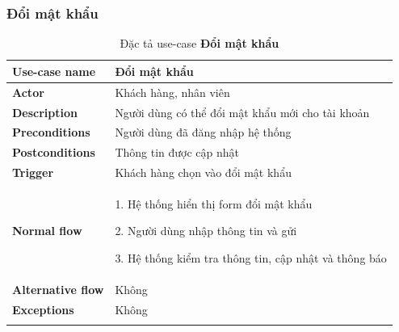 \subsubsection{Đổi mật khẩu}
{
    \setlength\extrarowheight{6pt}
    \begin{longtable}{| p{} | p{} |}
        \hline
        \textbf{Use-case name}
         &
        Đổi mật khẩu
        \\
        \hline
        \textbf{Actor}
         &
        Khách hàng, nhân viên
        \\
        \hline
        \textbf{Description}
         &
        Người dùng có thể đổi mật khẩu mới cho tài khoản
        \\
        \hline
        \textbf{Preconditions}
         &
        Người dùng đã đăng nhập hệ thống
        \\
        \hline
        \textbf{Postconditions}
         &
        Thông tin được cập nhật
        \\
        \hline
        \textbf{Trigger}
         &
        Khách hàng chọn vào đổi mật khẩu
        \\
        \hline
        \begin{flushleft}
            \textbf{Normal flow}
        \end{flushleft}
         &
        1. Hệ thống hiển thị form đổi mật khẩu

        2. Người dùng nhập thông tin và gửi

        3. Hệ thống kiểm tra thông tin, cập nhật và thông báo
        \\
        \hline
        \textbf{Alternative flow}
         &
        Không
        \\
        \hline
        \textbf{Exceptions}
         &
        Không
        \\
        \hline
        \caption{Đặc tả use-case \textbf{Đổi mật khẩu}}
    \end{longtable}
}



